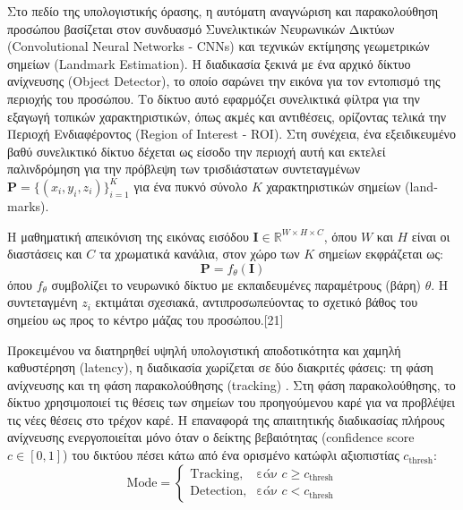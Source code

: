 \documentclass[twoside, a4paper, 11pt]{article}
\newcommand{\textlatin}[1]{\textenglish{#1}}
\begin{document}
Στο πεδίο της υπολογιστικής όρασης, η αυτόματη αναγνώριση και παρακολούθηση προσώπου 
βασίζεται στον συνδυασμό Συνελικτικών Νευρωνικών Δικτύων (\textlatin{Convolutional Neural Networks - CNNs}) και
 τεχνικών εκτίμησης γεωμετρικών σημείων (\textlatin{Landmark Estimation}). Η διαδικασία ξεκινά με ένα αρχικό δίκτυο ανίχνευσης
  (\textlatin{Object Detector}), το οποίο σαρώνει την εικόνα για τον εντοπισμό της περιοχής του προσώπου. 
  Το δίκτυο αυτό εφαρμόζει συνελικτικά φίλτρα για την εξαγωγή τοπικών χαρακτηριστικών, όπως ακμές και αντιθέσεις, 
  ορίζοντας τελικά την Περιοχή Ενδιαφέροντος (\textlatin{Region of Interest - ROI}). Στη συνέχεια, ένα εξειδικευμένο 
  βαθύ συνελικτικό δίκτυο δέχεται ως είσοδο την περιοχή αυτή και εκτελεί παλινδρόμηση για την πρόβλεψη των τρισδιάστατων 
  συντεταγμένων $\mathbf{P} = \{(x_i, y_i, z_i)\}_{i=1}^{K}$ για ένα πυκνό σύνολο $K$ χαρακτηριστικών σημείων (\textlatin{landmarks}).

Η μαθηματική απεικόνιση της εικόνας εισόδου $\mathbf{I} \in \mathbb{R}^{W \times H \times C}$, όπου $W$ και $H$ είναι οι διαστάσεις και $C$ τα χρωματικά κανάλια, στον χώρο των $K$ σημείων εκφράζεται ως:
\begin{equation}
\mathbf{P} = f_{\theta}(\mathbf{I})
\end{equation}
όπου $f_{\theta}$ συμβολίζει το νευρωνικό δίκτυο με εκπαιδευμένες παραμέτρους (βάρη) $\theta$. Η συντεταγμένη $z_i$ εκτιμάται σχεσιακά, αντιπροσωπεύοντας το σχετικό βάθος του σημείου ως προς το κέντρο μάζας του προσώπου.[21]

Προκειμένου να διατηρηθεί υψηλή υπολογιστική αποδοτικότητα και χαμηλή καθυστέρηση (\textlatin{latency}), η διαδικασία χωρίζεται σε δύο διακριτές φάσεις: τη φάση ανίχνευσης και τη φάση παρακολούθησης (\textlatin{tracking}) \cite{lugaresi2019mediapipe}. Στη φάση παρακολούθησης, το δίκτυο χρησιμοποιεί τις θέσεις των σημείων του προηγούμενου καρέ για να προβλέψει τις νέες θέσεις στο τρέχον καρέ. Η επαναφορά της απαιτητικής διαδικασίας πλήρους ανίχνευσης ενεργοποιείται μόνο όταν ο δείκτης βεβαιότητας (\textlatin{confidence score} $c \in [0,1]$) του δικτύου πέσει κάτω από ένα ορισμένο κατώφλι αξιοπιστίας $c_{\text{thresh}}$:
\begin{equation}
\text{Mode} = \begin{cases} 
\text{Tracking}, & \text{εάν } c \ge c_{\text{thresh}} \\ 
\text{Detection}, & \text{εάν } c < c_{\text{thresh}} 
\end{cases}
\end{equation}
\end{document}
